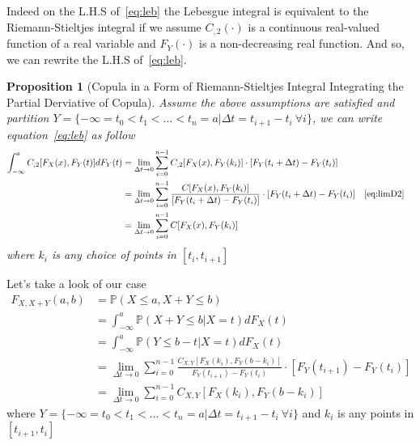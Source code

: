 \documentclass[11pt, leqno]{article}
\newtheorem{prop}{Proposition}[section]
\numberwithin{equation}{section}
\begin{document}
    Indeed on the L.H.S of~\ref{eq:leb} the Lebesgue integral is equivalent to the Riemann-Stieltjes integral
 if we assume $C_{,2}(\cdot)$ is a continuous real-valued function of a real variable and $F_Y(\cdot)$ is a non-decreasing real function.
And so, we can rewrite the L.H.S of~\ref{eq:leb}.
\begin{prop}[Copula in a Form of Riemann-Stieltjes Integral Integrating the Partial Derviative of Copula]\label{prop:leb2rie} Assume the above assumptions are satisfied
and partition $Y = \{-\infty=t_0<t_1<\dots<t_n=a| \Delta t = t_{i+1}-t_i~\forall i\}$, we can write equation~\ref{eq:leb} as follow
    \begin{align} \label{eq:leb2rie}
        \int^a_{-\infty}C_{,2}[F_X(x), F_Y(t)]dF_Y(t)
            &= \lim_{\Delta t \rightarrow 0} \sum^{n-1}_{i=0} C_{,2}[F_X(x), F_Y(k_i)] \cdot [F_Y(t_i+\Delta t)-F_Y(t_i)] \nonumber\\
            &= \lim_{\Delta t \rightarrow 0} \sum^{n-1}_{i=0}
                \frac{C[F_X(x), F_Y(k_i)]}
                {[F_Y(t_i+\Delta t)-F_Y(t_i)]}
                \cdot [F_Y(t_i+\Delta t)-F_Y(t_i)] &&\eqref{eq:limD2}\\
            &= \lim_{\Delta t \rightarrow 0} \sum^{n-1}_{i=0}C[F_X(x), F_Y(k_i)]
    \end{align}
    where $k_i$ is any choice of points in $[t_i, t_{i+1}]$
\end{prop}

Let's take a look of our case
    \begin{align}
    F_{X, X+Y}(a, b)
        &= \mathbb{P}(X \leq a, X+Y \leq b)\\
        &= \int^a_{-\infty} \mathbb{P}(X+Y \leq b|X=t) dF_X(t)\\
        &= \int^a_{-\infty} \mathbb{P}(Y \leq b-t|X=t) dF_X(t)\\
        &= \lim_{\Delta t \rightarrow 0 }\sum^{n-1}_{i=0}
        \frac{C_{X,Y}[F_X(k_i), F_Y(b - k_i)]}{F_Y(t_{i+1})-F_Y(t_{i})} \cdot [F_Y(t_{i+1})-F_Y(t_{i})] \\
        &= \lim_{\Delta t \rightarrow 0 }\sum^{n-1}_{i=0}C_{X,Y}[F_X(k_i), F_Y(b - k_i)]
    \end{align}
    where $Y = \{-\infty= t_0 < t_1<\dots<t_n=a| \Delta t = t_{i+1}-t_i~\forall i\}$ and $k_i$ is any points in $[t_{i+1},t_i]$ \newline
\end{document}

